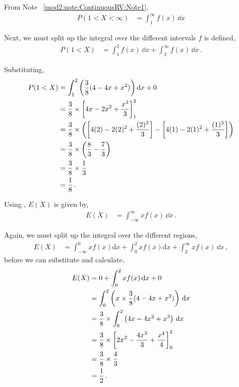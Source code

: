 \begin{subquestions}
\begin{subsubquestions}
From Note ~\ref{mod2:note:ContinuousRV:Note1},
\begin{align}
	 P(1<X<\infty) & = \int_{1}^{\infty}f(x)\,\dd x
\end{align}

Next, we must split up the integral over the different intervals $f$ is defined,
\begin{align}
P(1<X) & = \int_{1}^{2}f(x)\,\dd x+\int_{2}^{\infty}f(x)\,\dd x \,.
\end{align}

Substituting, 
\begin{align}
P(1<X) & = \int_1^2 \left(\frac{3}{8}(4-4x+x^2) \right)\mathrm{d} x + 0\nonumber \\
	    & = \frac{3}{8} \times \left[4x-2x^2+\frac{x^3}{3} \right]_1^2 \nonumber \\
	    & = \frac{3}{8} \times \left(\left[4(2)-2(2)^2+\frac{(2)^3}{3} \right]-\left[4(1)-2(1)^2+\frac{(1)^3}{3} \right] \right) \nonumber \\
	    & = \frac{3}{8} \times \left( \frac{8}{3} - \frac{7}{3}\right) \nonumber \\
	    & = \frac{3}{8} \times \frac{1}{3} \nonumber \\
	    & = \frac{1}{8} \,.	
\end{align}

\subsubquestion

Using , $E(X)$ is given by,
\begin{align}
	E(X) & = \int_{-\infty}^{\infty}x f(x)\,\dd x \,.
\end{align}

Again, we must split up the integral over the different regions,
\begin{align}
	E(X) & = \int_{-\infty}^{0}x f(x)\mathrm{d}x + \int_{0}^{2}x f(x)\mathrm{d}x + \int_{2}^{\infty}x f(x)\,\dd x\,,
\end{align}
before we can substitute and calculate,
\begin{align}
	E(X) & = 0 + \int_{0}^{2}x f(x)\,\mathrm{d} x + 0 \nonumber \\
	     & = \int_{0}^{2} \left(x \times \frac{3}{8}(4-4x+x^2)\right)\,\mathrm{d} x \nonumber \\
	     & = \frac{3}{8} \times \int_{0}^{2} \left(4x-4x^2+x^3\right)\,\mathrm{d} x \nonumber \\
	     & = \frac{3}{8} \times \left[ 2x^2 - \frac{4x^3}{3} + \frac{x^4}{4}\right]_0^2 \nonumber \\
	     & = \frac{3}{8} \times \frac{4}{3} \nonumber \\
	     & = \frac{1}{2} \,. \\
\end{align}


\end{subsubquestions}
\end{subquestions}
